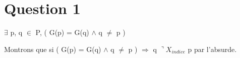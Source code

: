 
\section{Question 1}

$\exists$ p, q $\in$ P, ( G(p) = G(q) $\wedge$ q $\neq$ p )

Montrons que si ( G(p) = G(q) $\wedge$ q $\neq$ p ) $\Rightarrow$ q $\urcorner X_{indice} $  p par l'absurde.